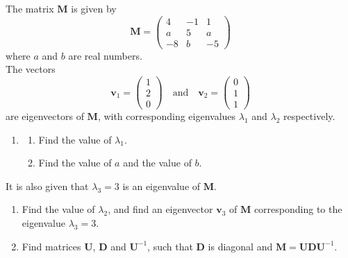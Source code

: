 \documentclass[leqno]{article}
\begin{document}
\begin{enumerate}[
  label=\textbf{\arabic*.},
  leftmargin=*,
  topsep=0pt,
  partopsep=0pt,
  parsep=0pt
]
\newpage

\questionitem

The matrix $\mathbf{M}$ is given by
\[\mathbf{M} = \begin{pmatrix} 4 & -1 & 1 \\ a & 5 & a \\ -8 & b & -5 \end{pmatrix}\]
where $a$ and $b$ are real numbers. \\

The vectors
\[\mathbf{v}_1 = \begin{pmatrix} 1 \\ 2 \\ 0 \end{pmatrix} \quad \text{and} \quad \mathbf{v}_2 = \begin{pmatrix} 0 \\ 1 \\ 1 \end{pmatrix}\]
are eigenvectors of $\mathbf{M}$, with corresponding eigenvalues $\lambda_1$ and $\lambda_2$ respectively. \\

\begin{enumerate}[label=\textbf{(\alph*)}]
  \item
  \begin{enumerate}[label=(\roman*)]
    \item Find the value of $\lambda_1$. 
    \item Find the value of $a$ and the value of $b$.  \\
  \end{enumerate}
\end{enumerate}
It is also given that $\lambda_3 = 3$ is an eigenvalue of $\mathbf{M}$. \\
\begin{enumerate}[label=\textbf{(\alph*)}, resume]
  \item Find the value of $\lambda_2$, and find an eigenvector $\mathbf{v}_3$ of $\mathbf{M}$ corresponding to the eigenvalue $\lambda_3 = 3$.  \\
  \item Find matrices $\mathbf{U}$, $\mathbf{D}$ and $\mathbf{U}^{-1}$, such that $\mathbf{D}$ is diagonal and $\mathbf{M} = \mathbf{U}\mathbf{D}\mathbf{U}^{-1}$.  \\
\end{enumerate}


\end{enumerate}
\end{document}
